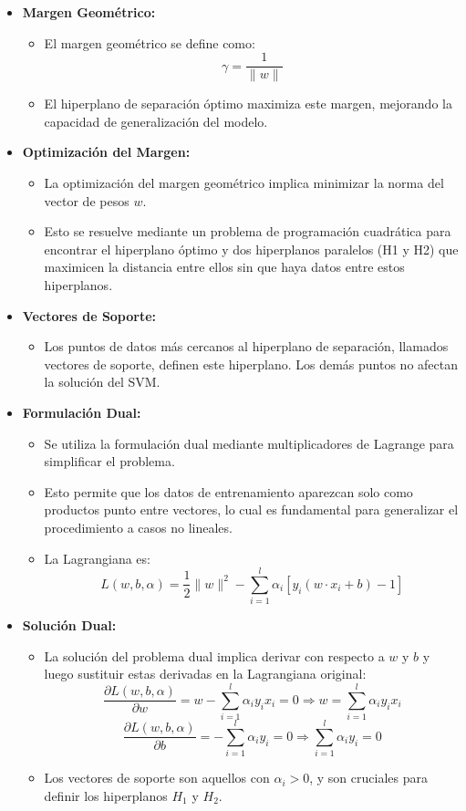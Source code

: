 \begin{itemize}
	\item \textbf{Margen Geométrico:}
	\begin{itemize}
		\item El margen geométrico se define como:
		\[
		\gamma = \frac{1}{\|w\|}
		\]
		\item El hiperplano de separación óptimo maximiza este margen, mejorando la capacidad de generalización del modelo.
	\end{itemize}
	
	\item \textbf{Optimización del Margen:}
	\begin{itemize}
		\item La optimización del margen geométrico implica minimizar la norma del vector de pesos \( w \).
		\item Esto se resuelve mediante un problema de programación cuadrática para encontrar el hiperplano óptimo y dos hiperplanos paralelos (H1 y H2) que maximicen la distancia entre ellos sin que haya datos entre estos hiperplanos.
	\end{itemize}
	
	\item \textbf{Vectores de Soporte:}
	\begin{itemize}
		\item Los puntos de datos más cercanos al hiperplano de separación, llamados vectores de soporte, definen este hiperplano. Los demás puntos no afectan la solución del SVM.
	\end{itemize}
	
	\item \textbf{Formulación Dual:}
	\begin{itemize}
		\item Se utiliza la formulación dual mediante multiplicadores de Lagrange para simplificar el problema.
		\item Esto permite que los datos de entrenamiento aparezcan solo como productos punto entre vectores, lo cual es fundamental para generalizar el procedimiento a casos no lineales.
		\item La Lagrangiana es:
		\[
		L(w, b, \alpha) = \frac{1}{2} \|w\|^2 - \sum_{i=1}^{l} \alpha_i \left[ y_i \left( w \cdot x_i + b \right) - 1 \right]
		\]
	\end{itemize}
	
	\item \textbf{Solución Dual:}
	\begin{itemize}
		\item La solución del problema dual implica derivar con respecto a \( w \) y \( b \) y luego sustituir estas derivadas en la Lagrangiana original:
		\[
		\frac{\partial L(w, b, \alpha)}{\partial w} = w - \sum_{i=1}^{l} \alpha_i y_i x_i = 0 \Rightarrow w = \sum_{i=1}^{l} \alpha_i y_i x_i
		\]
		\[        \frac{\partial L(w, b, \alpha)}{\partial b} = - \sum_{i=1}^{l} \alpha_i y_i = 0 \Rightarrow \sum_{i=1}^{l} \alpha_i y_i = 0        \]
		\item Los vectores de soporte son aquellos con \( \alpha_i > 0 \), y son cruciales para definir los hiperplanos \( H_1 \) y \( H_2 \).
	\end{itemize}
\end{itemize}
